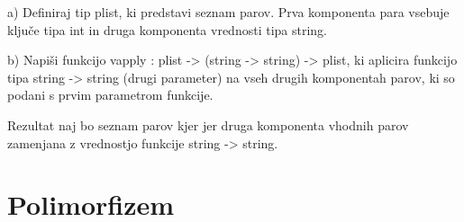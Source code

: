 \begin{ex}
  a) Definiraj tip plist, ki predstavi seznam parov. Prva komponenta
  para vsebuje klju\v ce tipa int in druga komponenta vrednosti tipa
  string.

  b) Napi\v si funkcijo vapply : plist -> (string -> string) -> plist,
  ki aplicira funkcijo tipa string -> string (drugi parameter) na vseh
  drugih komponentah parov, ki so podani s prvim parametrom
  funkcije. 

  Rezultat naj bo seznam parov kjer jer druga komponenta vhodnih parov
  zamenjana z vrednostjo funkcije string -> string.


\end{ex} 

\section{Polimorfizem}

